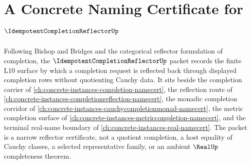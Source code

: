 \chapter{A Concrete Naming Certificate for $\IdempotentCompletionReflectorUp$}
\label{ch:concrete-instances-idempotent-completion-reflector-namecert}

Following Bishop and Bridges and the categorical reflector formulation of completion, the $\IdempotentCompletionReflectorUp$ packet records the finite L10 surface by which a completion request is reflected back through displayed completion rows without quotienting Cauchy data. It sits beside the completion carrier of \autoref{ch:concrete-instances-completion-namecert}, the reflection route of \autoref{ch:concrete-instances-completionreflection-namecert}, the monadic completion corridor of \autoref{ch:concrete-instances-cauchycompletionmonad-namecert}, the metric completion surface of \autoref{ch:concrete-instances-metriccompletion-namecert}, and the terminal real-name boundary of \autoref{ch:concrete-instances-real-namecert}. The packet is a narrow reflector certificate, not a quotient completion, a host equality of Cauchy classes, a selected representative family, or an ambient $\RealUp$ completeness theorem.

